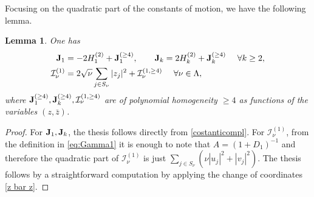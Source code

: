 \documentclass[reqno,11pt]{amsart}
\theoremstyle{plain}
\numberwithin{equation}{section}
\newtheorem{lemma}[theorem]{Lemma}
\newcommand{\I}{{\texttt{\bf J}}}
\newcommand{\cI}{{\mathcal I}}
\begin{document}
{\begin{equation}
\end{equation}
Focusing on the quadratic part of the constants of motion, we have the following lemma.
\begin{lemma}\label{lemma complex const}
	One has
	\begin{equation}\label{quadratic constants z}
		\begin{aligned}
			\I_1&= -2H_1^{(2)} + \I_1^{(\geq4)}, \qquad \I_k= 2H_k^{(2)} + \I_k^{(\geq4)} \quad\  \forall k\geq2,\\
			\cI_\nu^{(1)} &= 2\sqrt{\nu} \sum_{j\in S_\nu} |z_j|^2 + \cI_\nu^{(1, \geq4)} \quad\ \forall\nu\in\Lambda,
		\end{aligned}
	\end{equation}
	where $\I_1^{(\geq4)}, \I_k^{(\geq4)}, \cI_\nu^{(1, \geq4)}$ are of polynomial homogeneity $\geq4$ as functions of the variables $(z,\bar z)$.
\end{lemma}
\begin{proof}
	For $\I_1, \I_k$, the thesis follows directly from \eqref{costanticompl}. For $\cI_\nu^{(1)}$, from the definition in \eqref{eq:Gamma1} it is enough to note that $A=(1+D_1)^{-1}$ and therefore the quadratic part of $\cI_\nu^{(1)}$ is just $\sum_{j \in S_\nu} (\nu|u_j|^2 + |v_j|^2)$. The thesis follows by a straightforward computation by applying the change of coordinates \eqref{z bar z}.
\end{proof}








}
\end{document}
